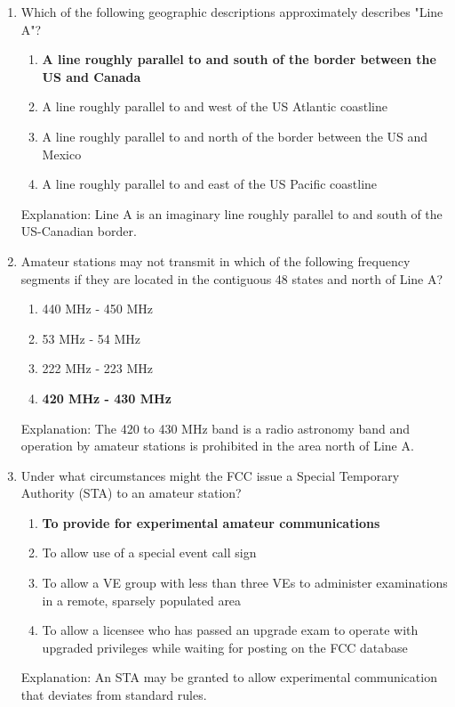 \begin{enumerate}
      \item Which of the following geographic descriptions approximately describes "Line A"?
      \begin{enumerate}
     \item \textbf {A line roughly parallel to and south of the border between the US and Canada}
       \item  A line roughly parallel to and west of the US Atlantic coastline
   \item  A line roughly parallel to and north of the border between the US and Mexico
      \item  A line roughly parallel to and east of the US Pacific coastline
     \end{enumerate}
      \textcolor{myred}{Explanation:}
      Line A is an imaginary line roughly parallel to and south of the US-Canadian border.
        
    \item Amateur stations may not transmit in which of the following frequency segments if they are located in the contiguous 48 states and north of Line A?
    \begin{enumerate}
          \item 440 MHz - 450 MHz
         \item  53 MHz - 54 MHz
       \item  222 MHz - 223 MHz
      \item \textbf {420 MHz - 430 MHz}
    \end{enumerate}
   \textcolor{myred}{Explanation:}
    The 420 to 430 MHz band is a radio astronomy band and operation by amateur stations is prohibited in the area north of Line A.

    \item Under what circumstances might the FCC issue a Special Temporary Authority (STA) to an amateur station?
       \begin{enumerate}
       \item \textbf {To provide for experimental amateur communications}
      \item  To allow use of a special event call sign
   \item  To allow a VE group with less than three VEs to administer examinations in a remote, sparsely populated area
      \item  To allow a licensee who has passed an upgrade exam to operate with upgraded privileges while waiting for posting on the FCC database
      \end{enumerate}
       \textcolor{myred}{Explanation:}
    An STA may be granted to allow experimental communication that deviates from standard rules.
        

\end{enumerate}
